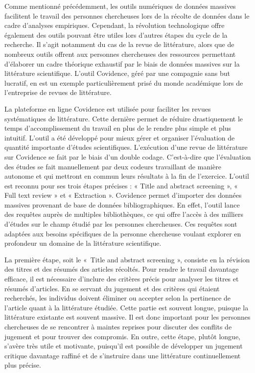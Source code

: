 \documentclass[
  letterpaper,
]{scrbook}
\begin{document}
Comme mentionné précédemment, les outils numériques de données massives
facilitent le travail des personnes chercheuses lors de la récolte de
données dans le cadre d'analyses empiriques. Cependant, la révolution
technologique offre également des outils pouvant être utiles lors
d'autres étapes du cycle de la recherche. Il s'agit notamment du cas de
la revue de littérature, alors que de nombreux outils offrent aux
personnes chercheuses des ressources permettant d'élaborer un cadre
théorique exhaustif par le biais de données massives sur la littérature
scientifique. L'outil Covidence, géré par une compagnie sans but
lucratif, en est un exemple particulièrement prisé du monde académique
lors de l'entreprise de revues de littérature.

La plateforme en ligne Covidence est utilisée pour faciliter les revues
systématiques de littérature. Cette dernière permet de réduire
drastiquement le temps d'accomplissement du travail en plus de le rendre
plus simple et plus intuitif. L'outil a été développé pour mieux gérer
et organiser l'évaluation de quantité importante d'études scientifiques.
L'exécution d'une revue de littérature sur Covidence se fait par le
biais d'un double codage. C'est-à-dire que l'évaluation des études se
fait manuellement par deux codeurs travaillant de manière autonome et
qui mettront en commun leurs résultats à la fin de l'exercice. L'outil
est reconnu pour ses trois étapes précises : « Title and abstract
screening », « Full text review » et « Extraction ». Covidence permet
d'importer des données massives provenant de base de données
bibliographiques. En effet, l'outil lance des requêtes auprès de
multiples bibliothèques, ce qui offre l'accès à des milliers d'études
sur le champ étudié par les personnes chercheuses. Ces requêtes sont
adaptées aux besoins spécifiques de la personne chercheuse voulant
explorer en profondeur un domaine de la littérature scientifique.

La première étape, soit le «~Title and abstract screening », consiste en
la révision des titres et des résumés des articles récoltés. Pour rendre
le travail davantage efficace, il est nécessaire d'inclure des critères
précis pour analyser les titres et résumés d'articles. En se servant du
jugement et des critères qui étaient recherchés, les individus doivent
éliminer ou accepter selon la pertinence de l'article quant à la
littérature étudiée. Cette partie est souvent longue, puisque la
littérature existante est souvent massive. Il est donc important pour
les personnes chercheuses de se rencontrer à maintes reprises pour
discuter des conflits de jugement et pour trouver des compromis. En
outre, cette étape, plutôt longue, s'avère très utile et motivante,
puisqu'il est possible de développer un jugement critique davantage
raffiné et de s'instruire dans une littérature continuellement plus
précise.
\end{document}
